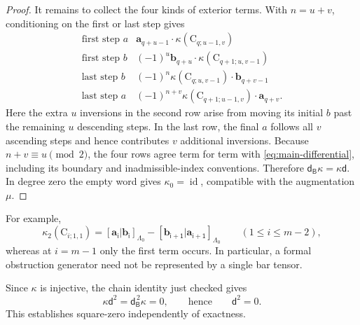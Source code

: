 \documentclass[a4paper,11pt,oneside,reqno]{amsart}
\theoremstyle{definition}
\numberwithin{equation}{section}
\begin{document}
\begin{proof}
It remains to collect the four kinds of exterior terms. With
$n=u+v$, conditioning on the first or last step gives
\begin{equation}\label{cup:eq:four-exterior}
\begin{array}{c|l}
\text{first step $a$}
 &\mathbf a_{q+u-1}\cdot\kappa(\mathrm C_{q;u-1,v})\\
\text{first step $b$}
 &(-1)^u\mathbf b_{q+u}\cdot\kappa(\mathrm C_{q+1;u,v-1})\\
\text{last step $b$}
 &(-1)^n\kappa(\mathrm C_{q;u,v-1})\cdot\mathbf b_{q+v-1}\\
\text{last step $a$}
 &(-1)^{n+v}\kappa(\mathrm C_{q+1;u-1,v})\cdot\mathbf a_{q+v}.
\end{array}
\end{equation}
Here the extra $u$ inversions in the second row arise from moving its
initial $b$ past the remaining $u$ descending steps. In the last row,
the final $a$ follows all $v$ ascending steps and hence contributes
$v$ additional inversions. Because $n+v\equiv u\pmod2$, the four
rows agree term for term with \eqref{eq:main-differential}, including
its boundary and inadmissible-index conventions. Therefore
$\mathsf d_{\mathsf B}\kappa=\kappa\mathsf d$.
In degree zero the empty word gives $\kappa_0=\operatorname{id}$,
compatible with the augmentation $\mu$.
\end{proof}

For example,
\[
 \kappa_2(\mathrm C_{i;1,1})
 =\mathsf{[\mathbf a_i|\mathbf b_i]}_{\Lambda_0}
 -\mathsf{[\mathbf b_{i+1}|\mathbf a_{i+1}]}_{\Lambda_0}
 \qquad(1\leq i\leq m-2),
\]
whereas at $i=m-1$ only the first term occurs. In particular, a
formal obstruction generator need not be represented by a single
bar tensor.


Since $\kappa$ is injective, the chain identity just checked gives
\[
 \kappa\mathsf d^2=\mathsf d_{\mathsf B}^{\,2}\kappa=0,
 \qquad\text{hence}\qquad\mathsf d^2=0.
\]
This establishes square-zero independently of exactness.
\end{document}
